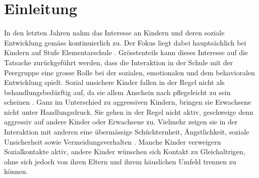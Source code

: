 %
%
\chapter{Einleitung}\label{chap.einleitung}
\glsresetall
In den letzten Jahren nahm das Interesse an Kindern und deren soziale Entwicklung gemäss  kontinuierlich zu. Der Fokus liegt dabei hauptsächlich bei Kindern auf Stufe Elementarschule \cite{Casey:2001, Gest:2001, Howes:1987, Laosa:1989, Newcomb:1993, Tsiantis:1994, Yeates:1989}. Grösstenteils kann dieses Interesse auf die Tatsache zurückgeführt werden, dass die Interaktion in der Schule mit der Peergruppe eine grosse Rolle bei der sozialen, emotionalen und dem behavioralen Entwicklung spielt\cite{Kupersmidt:1990, Parker:1987, Sandstrom:2003}.\newline
Sozial unsichere Kinder fallen in der Regel nicht als behandlungsbedürftig auf, da sie allem Anschein nach pflegeleicht zu sein scheinen \cite{Petermann:2015}. Ganz im Unterschied zu aggressiven Kindern, bringen sie Erwachsene nicht unter Handlungsdruck. Sie gehen in der Regel nicht aktiv, geschweige denn aggressiv auf andere Kinder oder Erwachsene zu. Vielmehr zeigen sie in der Interaktion mit anderen eine übermässige Schüchternheit, Ängstlichkeit, soziale Unsicherheit sowie Vermeidungsverhalten \cite{Petermann:2015}. Manche Kinder verweigern Sozialkontakte aktiv, andere Kinder wünschen sich Kontakt zu Gleichaltrigen, ohne sich jedoch von ihren Eltern und ihrem häuslichen Umfeld trennen zu können.

